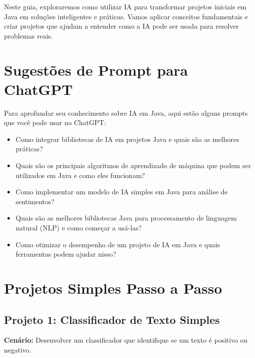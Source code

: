 \documentclass[a4paper,12pt]{book}
\begin{document}
Neste guia, exploraremos como utilizar IA para transformar projetos iniciais em Java em soluções inteligentes e práticas. Vamos aplicar conceitos fundamentais e criar projetos que ajudam a entender como a IA pode ser usada para resolver problemas reais.

\section{Sugestões de Prompt para ChatGPT}
Para aprofundar seu conhecimento sobre IA em Java, aqui estão alguns prompts que você pode usar no ChatGPT:

\begin{itemize}
  \item Como integrar bibliotecas de IA em projetos Java e quais são as melhores práticas?
  \item Quais são os principais algoritmos de aprendizado de máquina que podem ser utilizados em Java e como eles funcionam?
  \item Como implementar um modelo de IA simples em Java para análise de sentimentos?
  \item Quais são as melhores bibliotecas Java para processamento de linguagem natural (NLP) e como começar a usá-las?
  \item Como otimizar o desempenho de um projeto de IA em Java e quais ferramentas podem ajudar nisso?
\end{itemize}

\section{Projetos Simples Passo a Passo}

\subsection{Projeto 1: Classificador de Texto Simples}
\textbf{Cenário:} Desenvolver um classificador que identifique se um texto é positivo ou negativo.
\end{document}
